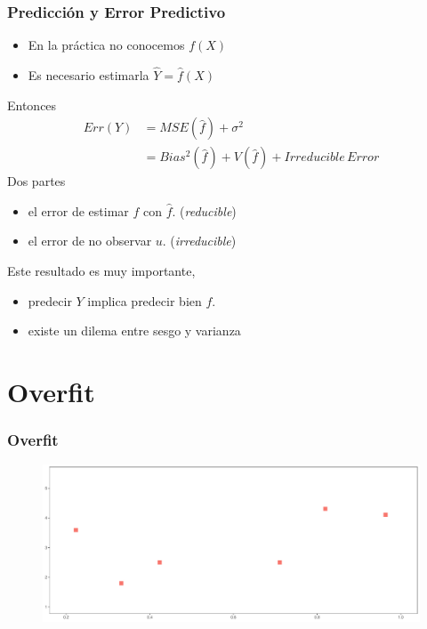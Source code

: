 \documentclass[
  shownotes,
  xcolor={svgnames},
  hyperref={colorlinks,citecolor=DarkBlue,linkcolor=DarkRed,urlcolor=DarkBlue}
  , aspectratio=169]{beamer}
\begin{document}
\begin{frame}
\frametitle{Predicción y Error Predictivo}

\begin{itemize}
  \item En la práctica no conocemos $f(X)$
  \item Es necesario estimarla $\hat Y = \hat f(X)$ 

\end{itemize}

\medskip
Entonces
\begin{align}
  Err (  Y )  &= MSE(\hat f) + \sigma^2  \\
                 &= Bias^2(\hat f) + V(\hat f) +  Irreducible\,Error
\end{align}
\medskip
Dos partes 
\begin{itemize}
  \item  el error de estimar $f$ con $\hat f$. (\emph{reducible})
  \item  el error de no observar $u$. (\emph{irreducible})
\end{itemize}

\medskip

Este resultado es muy importante,  
\begin{itemize}
\item predecir $Y$ implica predecir bien $f$.
\item existe un dilema entre sesgo y varianza
\end{itemize}

\end{frame}
\section{Overfit}
\begin{frame}[fragile]
\frametitle{Overfit}


        \begin{figure}[H] \centering
            \captionsetup{justification=centering}
              \includegraphics[scale=0.4]{figures/fig_1a.pdf}
 \end{figure}

\end{frame}
\end{document}
